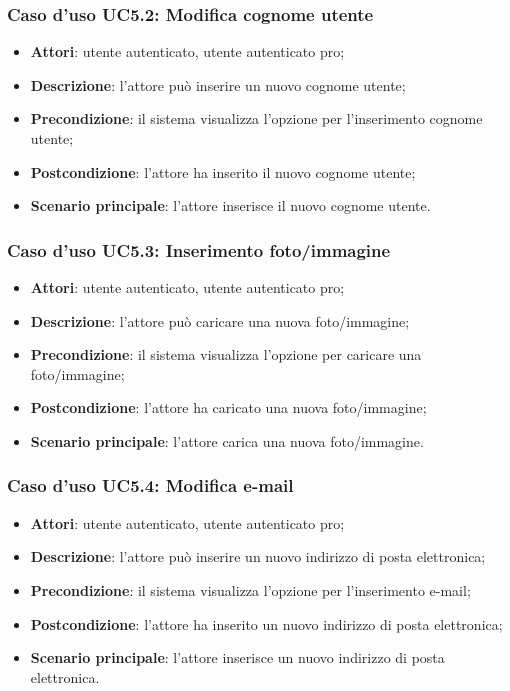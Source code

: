 \subsubsection{Caso d'uso UC5.2: Modifica cognome utente}
\begin{itemize}
	\item \textbf{Attori}: utente autenticato, utente autenticato pro;
	\item \textbf{Descrizione}: l'attore può inserire un nuovo cognome utente;
	\item \textbf{Precondizione}: il sistema visualizza l'opzione per l'inserimento cognome utente; 
	\item \textbf{Postcondizione}:  l'attore ha inserito il nuovo cognome utente;
	\item \textbf{Scenario principale}: l'attore inserisce il nuovo cognome utente.
\end{itemize}

\subsubsection{Caso d'uso UC5.3: Inserimento foto/immagine}
\begin{itemize}
	\item \textbf{Attori}: utente autenticato, utente autenticato pro;
	\item \textbf{Descrizione}: l'attore può caricare una nuova foto/immagine;
	\item \textbf{Precondizione}: il sistema visualizza l'opzione per caricare una foto/immagine;  
	\item \textbf{Postcondizione}: l'attore ha caricato una nuova foto/immagine;
	\item \textbf{Scenario principale}: l'attore carica una nuova foto/immagine.
\end{itemize}

\subsubsection{Caso d'uso UC5.4: Modifica e-mail}
\begin{itemize}
	\item \textbf{Attori}: utente autenticato, utente autenticato pro;
	\item \textbf{Descrizione}: l'attore può inserire un nuovo indirizzo di posta elettronica;
	\item \textbf{Precondizione}: il sistema visualizza l'opzione per l'inserimento e-mail;
	\item \textbf{Postcondizione}: l'attore ha inserito un nuovo indirizzo di posta elettronica;
	\item \textbf{Scenario principale}: l'attore inserisce un nuovo indirizzo di posta elettronica.
\end{itemize}

